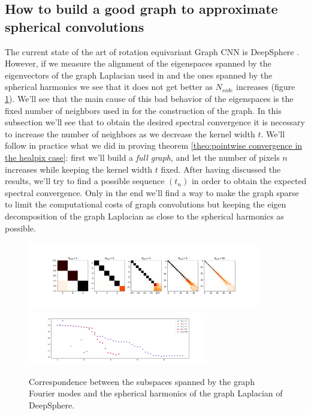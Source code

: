 \clearpage
\subsection{How to build a good graph to approximate spherical convolutions}
\label{sec:Chapter2:How to build a good graph}
The current state of the art of rotation equivariant Graph CNN is DeepSphere \cite{DeepSphere}. However, if we measure the alignment of the eigenspaces spanned by the eigenvectors of the graph Laplacian used in \cite{DeepSphere} and the ones spanned by the spherical harmonics we see that it does not get better as $N_{side}$ increases (figure \ref{fig:deepsphere results}). We'll see that the main cause of this bad behavior of the eigenspaces is the fixed number of neighbors used in \cite{DeepSphere} for the construction of the graph. In this subsection we'll see that to obtain the desired spectral convergence it is necessary to increase the number of neighbors as we decrease the kernel width $t$. We'll follow in practice what we did in proving theorem \ref{theo:pointwise convergence in the healpix case}: first we'll build a \textit{full graph}, and let the number of pixels $n$ increases while keeping the kernel width $t$ fixed. After having discussed the results, we'll try to find a possible sequence $(t_n)$ in order to obtain the expected spectral convergence. Only in the end we'll find a way to make the graph sparse to limit the computational costs of graph convolutions but keeping the eigen decomposition of the graph Laplacian as close to the spherical harmonics as possible.
\begin{figure}[h!]
	\centering
	\includegraphics[width=0.9\textwidth]{../codes/02.HeatKernelGraphLaplacian/HEALPix/06_figures/deepsphere_original.png}
		\includegraphics[width=0.7\textwidth]{../codes/02.HeatKernelGraphLaplacian/HEALPix/06_figures/deepsphere_original_diagonal.png}	
		\caption{\label{fig:deepsphere results}Correspondence between the subspaces spanned by the graph Fourier modes and the spherical harmonics of the graph Laplacian of DeepSphere.}
\end{figure}

